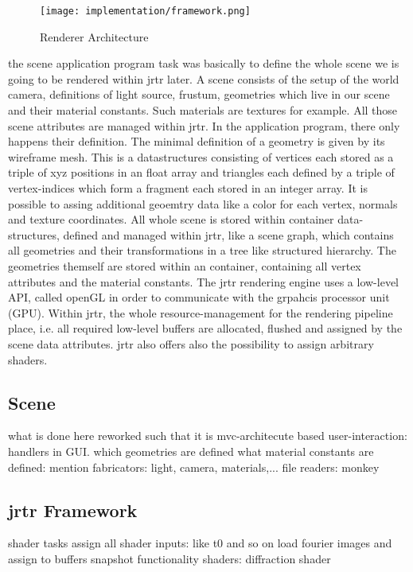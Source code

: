 \begin{figure}[H]
  \centering
  \texttt{[image: implementation/framework.png]}
  \label{rendererArchitecture}
  \caption{Renderer Architecture}
\end{figure}

the scene application program task was basically to define the whole scene we is going to be rendered within jrtr later.
A scene consists of the setup of the world camera, definitions of light source, frustum, geometries which live in our scene and their material constants. Such materials are textures for example. All those scene attributes are managed within jrtr. In the application program, there only happens their definition.
The minimal definition of a geometry is given by its wireframe mesh. This is a datastructures consisting of vertices each stored as a triple of xyz positions in an float array and triangles each defined by a triple of vertex-indices which form a fragment each stored in an integer array. It is possible to assing additional geoemtry data like a color for each vertex, normals and texture coordinates.
All whole scene is stored within container data-structures, defined and managed within jrtr, like a scene graph, which contains all geometries and their transformations in a tree like structured hierarchy. The geometries themself are stored within an container, containing all vertex attributes and the material constants.
The jrtr rendering engine uses a low-level API, called openGL in order to communicate with the grpahcis processor unit (GPU). Within jrtr, the whole resource-management for the rendering pipeline place, i.e. all required low-level buffers are allocated, flushed and assigned by the scene data attributes. jrtr also offers also the possibility to assign arbitrary shaders.
   
\subsection{Scene}
what is done here 
reworked such that it is mvc-architecute based
user-interaction: handlers in GUI.
which geometries are defined
what material constants are defined: mention fabricators: light, camera, materials,...
file readers: monkey

\subsection{jrtr Framework}
shader tasks
assign all shader inputs: like t0 and so on
load fourier images and assign to buffers
snapshot functionality
shaders: diffraction shader



